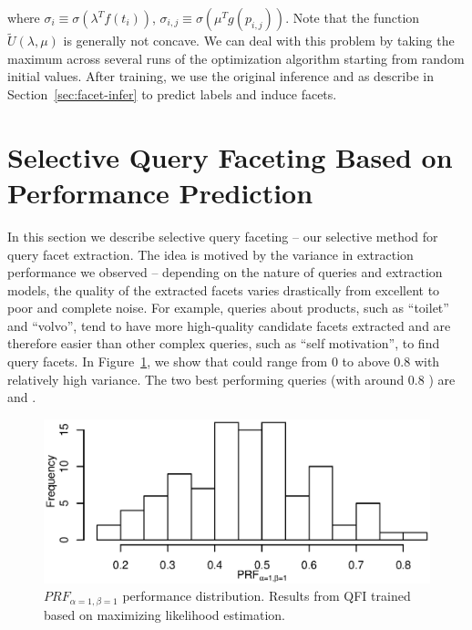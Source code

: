where $\sigma_i\equiv \sigma(\lambda^T f(t_i))$, $\sigma_{i,j}\equiv \sigma(\mu^T g(p_{i,j}))$. Note that the function $\widetilde{U}(\lambda,\mu)$ is generally not concave. We can deal with this problem by taking the maximum across several runs of the optimization algorithm starting from random initial values. %
After training, we use the original inference \QFI and \QFJ as describe in Section~\ref{sec:facet-infer} to predict labels and induce facets. %

\section{Selective Query Faceting Based on Performance Prediction}
\label{sec:precision-selective}
In this section we describe selective query faceting -- our selective method for query facet extraction. The idea is motived by the variance in extraction performance we observed -- depending on the nature of queries and extraction models, the quality of the extracted facets varies drastically from excellent to poor and complete noise.  For example, queries about products, such as ``toilet'' and ``volvo'', tend to have more high-quality candidate facets extracted and are therefore easier than other complex queries, such as ``self motivation'', to find query facets. In Figure~\ref{fig:prf-hist}, we show that \PRF could range from 0 to above 0.8 with relatively high variance. The two best performing queries (with around 0.8 ) are  and .
\begin{figure}[ht!]
\centering
\caption{$P\!R\!F_{\alpha=1,\beta=1}$ performance distribution. Results from QFI trained based on maximizing likelihood estimation.}
\label{fig:prf-hist}
\includegraphics[width=0.8\columnwidth]{figure/qf13-qp-prf.eps}
\end{figure}

